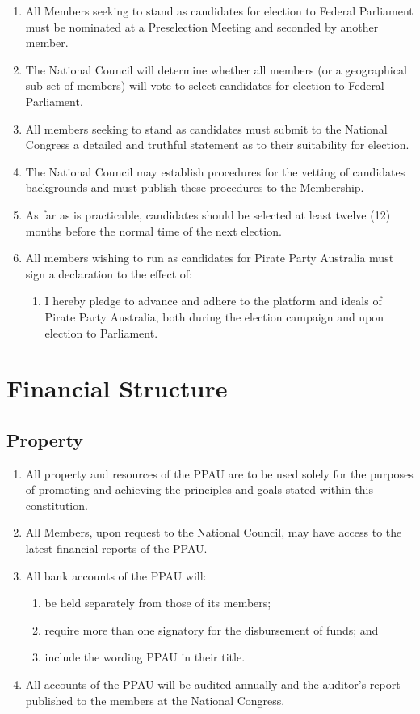 \documentclass[a4paper,titlepage,8.5pt]{article}
\begin{document}
\begin{enumerate}
\item All Members seeking to stand as candidates for election to Federal Parliament must be nominated at a Preselection Meeting and seconded by another member.
\item The National Council will determine whether all members (or a geographical sub-set of members) will vote to select candidates for election to Federal Parliament.
\item All members seeking to stand as candidates must submit to the National Congress a detailed and truthful statement as to their suitability for election.
\item The National Council may establish procedures for the vetting of candidates backgrounds and must publish these procedures to the Membership. 
\item As far as is practicable, candidates should be selected at least twelve (12) months before the normal time of the next election.
\item All members wishing to run as candidates for Pirate Party Australia must sign a declaration to the effect of:
\begin{enumerate}
	\item I hereby pledge to advance and adhere to the platform and ideals of Pirate Party Australia, both during the election campaign and upon election to Parliament.
\end{enumerate}
\end{enumerate}

\section{Financial Structure}

\subsection{Property}

\begin{enumerate}
\item All property and resources of the PPAU are to be used solely for the purposes of promoting and achieving the principles and goals stated within this constitution.
\item All Members, upon request to the National Council, may have access to the latest financial reports of the PPAU.
\item All bank accounts of the PPAU will:
\begin{enumerate}
\item be held separately from those of its members;
\item require more than one signatory for the disbursement of funds; and 
\item include the wording PPAU in their title.
\end{enumerate}
\item All accounts of the PPAU will be audited annually and the auditor’s report published to the members at the National Congress.
\end{enumerate}
\end{document}
